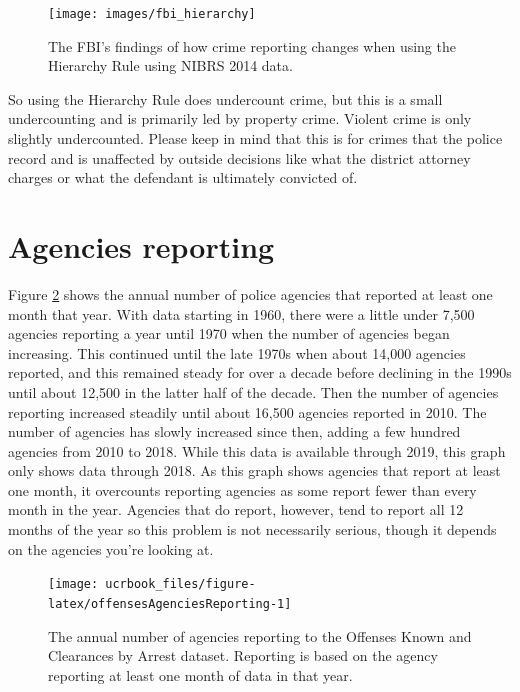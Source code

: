 \documentclass[
  12pt,
  openany]{book}
\begin{document}
\begin{figure}

{\centering \texttt{[image: images/fbi\_hierarchy]} 

}

\caption{The FBI's findings of how crime reporting changes when using the Hierarchy Rule using NIBRS 2014 data.}\label{fig:fbiHierarchy}
\end{figure}

So using the Hierarchy Rule does undercount crime, but this is a small undercounting and is primarily led by property crime. Violent crime is only slightly undercounted. Please keep in mind that this is for crimes that the police record and is unaffected by outside decisions like what the district attorney charges or what the defendant is ultimately convicted of.

\hypertarget{agencies-reporting}{%
\section{Agencies reporting}\label{agencies-reporting}}

Figure \ref{fig:offensesAgenciesReporting} shows the annual number of police agencies that reported at least one month that year. With data starting in 1960, there were a little under 7,500 agencies reporting a year until 1970 when the number of agencies began increasing. This continued until the late 1970s when about 14,000 agencies reported, and this remained steady for over a decade before declining in the 1990s until about 12,500 in the latter half of the decade. Then the number of agencies reporting increased steadily until about 16,500 agencies reported in 2010. The number of agencies has slowly increased since then, adding a few hundred agencies from 2010 to 2018. While this data is available through 2019, this graph only shows data through 2018. As this graph shows agencies that report at least one month, it overcounts reporting agencies as some report fewer than every month in the year. Agencies that do report, however, tend to report all 12 months of the year so this problem is not necessarily serious, though it depends on the agencies you're looking at.

\begin{figure}

{\centering \texttt{[image: ucrbook\_files/figure-latex/offensesAgenciesReporting-1]} 

}

\caption{The annual number of agencies reporting to the Offenses Known and Clearances by Arrest dataset. Reporting is based on the agency reporting at least one month of data in that year.}\label{fig:offensesAgenciesReporting}
\end{figure}
\end{document}
